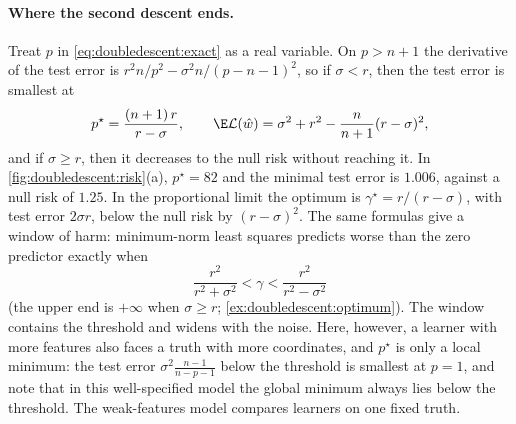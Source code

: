 \begin{refsection}
\paragraph{Where the second descent ends.} Treat $p$ in \eqref{eq:doubledescent:exact} as a real variable. On $p>n+1$ the derivative of the test error is $r^2n/p^2-\sigma^2n/(p-n-1)^2$, so if $\sigma<r$, then the test error is smallest at
\begin{equation}\label{eq:doubledescent:pstar}
  p^\star=\frac{(n+1)\,r}{r-\sigma},\qquad \E\Loss(\hat w)=\sigma^2+r^2-\frac n{n+1}(r-\sigma)^2 ,
\end{equation}
and if $\sigma\ge r$, then it decreases to the null risk without reaching it. In \cref{fig:doubledescent:risk}(a), $p^\star=82$ and the minimal test error is $1.006$, against a null risk of $1.25$. In the proportional limit the optimum is $\gamma^\star=r/(r-\sigma)$, with test error $2\sigma r$, below the null risk by $(r-\sigma)^2$. The same formulas give a window of harm: minimum-norm least squares predicts worse than the zero predictor exactly when
\begin{equation}\label{eq:doubledescent:window}
  \frac{r^2}{r^2+\sigma^2}<\gamma<\frac{r^2}{r^2-\sigma^2}
\end{equation}
(the upper end is $+\infty$ when $\sigma\ge r$; \cref{ex:doubledescent:optimum}). The window contains the threshold and widens with the noise. Here, however, a learner with more features also faces a truth with more coordinates, and $p^\star$ is only a local minimum: the test error $\sigma^2\frac{n-1}{n-p-1}$ below the threshold is smallest at $p=1$, and \textcite{HastieEtAl2022} note that in this well-specified model the global minimum always lies below the threshold. The weak-features model compares learners on one fixed truth.


\end{refsection}
